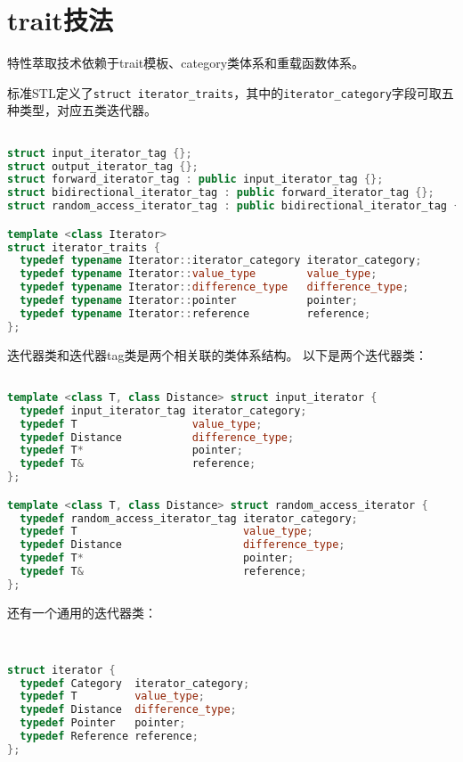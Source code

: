 
\section{trait技法}

特性萃取技术依赖于trait模板、category类体系和重载函数体系。

标准STL定义了\verb$struct iterator_traits$，其中的\verb$iterator_category$字段可取五种类型，对应五类迭代器。
\begin{lstlisting}[language=C++]

struct input_iterator_tag {};
struct output_iterator_tag {};
struct forward_iterator_tag : public input_iterator_tag {};
struct bidirectional_iterator_tag : public forward_iterator_tag {};
struct random_access_iterator_tag : public bidirectional_iterator_tag {};

template <class Iterator>
struct iterator_traits {
  typedef typename Iterator::iterator_category iterator_category;
  typedef typename Iterator::value_type        value_type;
  typedef typename Iterator::difference_type   difference_type;
  typedef typename Iterator::pointer           pointer;
  typedef typename Iterator::reference         reference;
};

\end{lstlisting}

迭代器类和迭代器tag类是两个相关联的类体系结构。
以下是两个迭代器类：
\begin{lstlisting}[language=C++]

template <class T, class Distance> struct input_iterator {
  typedef input_iterator_tag iterator_category;
  typedef T                  value_type;
  typedef Distance           difference_type;
  typedef T*                 pointer;
  typedef T&                 reference;
};

template <class T, class Distance> struct random_access_iterator {
  typedef random_access_iterator_tag iterator_category;
  typedef T                          value_type;
  typedef Distance                   difference_type;
  typedef T*                         pointer;
  typedef T&                         reference;
};

\end{lstlisting}
还有一个通用的迭代器类：
\begin{lstlisting}[language=C++]


struct iterator {
  typedef Category  iterator_category;
  typedef T         value_type;
  typedef Distance  difference_type;
  typedef Pointer   pointer;
  typedef Reference reference;
};

\end{lstlisting}

